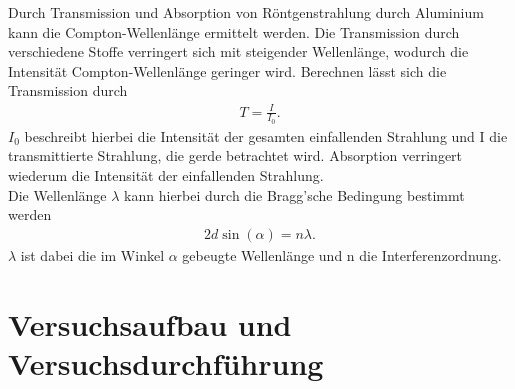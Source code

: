 Durch Transmission und Absorption von Röntgenstrahlung durch Aluminium kann
die Compton-Wellenlänge ermittelt werden. Die Transmission durch verschiedene Stoffe
verringert sich mit steigender Wellenlänge, wodurch die Intensität
Compton-Wellenlänge geringer wird. Berechnen lässt sich die Transmission durch
\begin{align}
    T=\frac{I}{I_0} \label{eq:3}.
\end{align}
$I_0$ beschreibt hierbei die Intensität der gesamten einfallenden Strahlung und I
die transmittierte Strahlung, die gerde betrachtet wird.
\justifying Absorption verringert wiederum 
 die Intensität der einfallenden Strahlung.\\
Die Wellenlänge $\lambda$ kann hierbei durch die Bragg'sche Bedingung bestimmt 
werden
\begin{align}
    2d \sin (\alpha)=n \lambda \label{eq:4}.
\end{align}
$\lambda$ ist dabei die im Winkel $\alpha$ gebeugte Wellenlänge und n die Interferenzordnung.



\section{Versuchsaufbau und Versuchsdurchführung}\justifying

